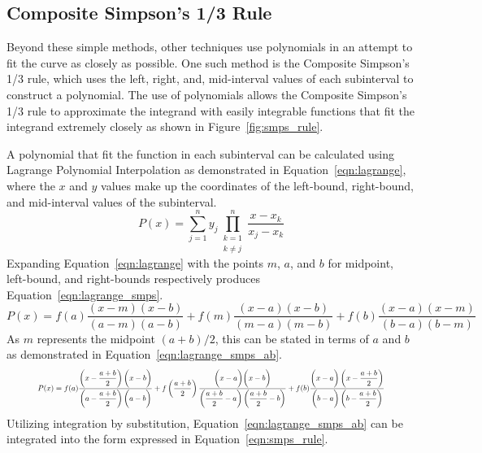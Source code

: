 \documentclass{paper}
\begin{document}
\subsection{Composite Simpson's 1/3 Rule}
Beyond these simple methods, other techniques use polynomials in an attempt to fit the curve as closely as possible.
One such method is the Composite Simpson's 1/3 rule, which uses the left, right, and, mid-interval values of each subinterval to construct a polynomial. The use of polynomials allows the Composite Simpson's 1/3 rule to approximate the integrand with easily integrable functions that fit the integrand extremely closely as shown in Figure~\ref{fig:smps_rule}.
% 

% 
A polynomial that fit the function in each subinterval can be calculated using Lagrange Polynomial Interpolation as demonstrated in Equation~\ref{eqn:lagrange}, where the \(x\) and \(y\) values make up the coordinates of the left-bound, right-bound, and mid-interval values of the subinterval.
% 
\begin{equation}
    \label{eqn:lagrange}
    P(x) = \sum_{j=1}^n y_j \prod_{\substack{k = 1 \\ k \neq j}}^n \dfrac{x - x_k}{x_j - x_k}
\end{equation}
% 
Expanding Equation~\ref{eqn:lagrange} with the points \(m\), \(a\), and \(b\) for midpoint, left-bound, and right-bounds respectively produces Equation~\ref{eqn:lagrange_smps}.
% 
\begin{equation}
    \label{eqn:lagrange_smps}
    P(x) = f(a) \dfrac{(x - m)(x - b)}{(a - m)(a - b)} + f(m) \dfrac{(x - a)(x - b)}{(m - a)(m - b)} + f(b) \dfrac{(x - a)(x - m)}{(b - a)(b - m)}
\end{equation}
% 
As \(m\) represents the midpoint \((a + b) / 2\), this can be stated in terms of \(a\) and \(b\) as demonstrated in Equation~\ref{eqn:lagrange_smps_ab}.
% 
\begin{equation}
    \label{eqn:lagrange_smps_ab}
    \resizebox{.9\textwidth}{!} 
    {
    $P(x) = f(a) \dfrac{\left(x - \dfrac{a+b}{2}\right)\biggl(x - b\biggr)}{\left(a - \dfrac{a+b}{2}\right)\biggl(a - b\biggr)} + f\left(\dfrac{a+b}{2}\right) \dfrac{\biggl(x - a\biggr)\biggl(x - b\biggr)}{\left(\dfrac{a+b}{2} - a\right)\left(\dfrac{a+b}{2} - b\right)} + f(b) \dfrac{\biggl(x - a\biggr)\left(x - \dfrac{a+b}{2}\right)}{\biggl(b - a\biggr)\left(b - \dfrac{a+b}{2}\right)}$
    }
\end{equation}
% 
Utilizing integration by substitution, Equation~\ref{eqn:lagrange_smps_ab} can be integrated into the form expressed in Equation~\ref{eqn:smps_rule}.
\end{document}
